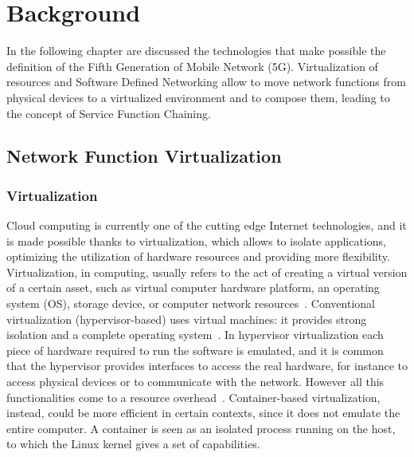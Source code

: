 \chapter{Background}
\label{chap:background}
In the following chapter are discussed the technologies that make possible the
definition of the Fifth Generation of Mobile Network (5G). Virtualization of
resources and Software Defined Networking allow to move network functions from
physical devices to a virtualized environment and to compose them, leading to
the concept of Service Function Chaining.

\section{Network Function Virtualization}

\subsection{Virtualization}
Cloud computing is currently one of the cutting edge Internet technologies, and
it is made possible thanks to virtualization, which allows to isolate
applications, optimizing the utilization of hardware resources and providing
more flexibility. Virtualization, in computing, usually refers to the act of
creating a virtual version of a certain asset, such as virtual computer hardware
platform, an operating system (OS), storage device, or computer network
resources~\cite{liu2014research}. Conventional virtualization
(hypervisor-based) uses virtual machines: it provides strong isolation and a
complete operating system~\cite{eder2016hypervisor}. In hypervisor
virtualization each piece of hardware required to run the software is
emulated, and it is common that the hypervisor provides interfaces to access
the real hardware, for instance to access physical devices or to communicate
with the network. However all this functionalities come to a resource
overhead~\cite{scheepers2014virtualization}. Container-based virtualization,
instead, could be more efficient in certain contexts, since it does not
emulate the entire computer. A container is seen as an isolated process running
on the host, to which the Linux kernel gives a set of capabilities.

